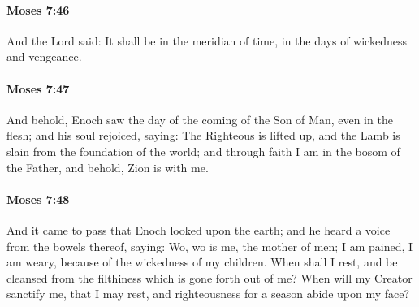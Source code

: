 		\paragraph{Moses 7:46} %
			\label{MOSES-7-46}

			And the Lord said: It shall be in the meridian of time, in the days of wickedness and vengeance.


		\paragraph{Moses 7:47} %
			\label{MOSES-7-47}

			And behold, Enoch saw the day of the coming of the Son of Man, even in the flesh; and his soul rejoiced, saying: The Righteous is lifted up, and the Lamb is slain from the foundation of the world; and through faith I am in the bosom of the Father, and behold, Zion is with me.


		\paragraph{Moses 7:48} %
			\label{MOSES-7-48}

			And it came to pass that Enoch looked upon the earth; and he heard a voice from the bowels thereof, saying: Wo, wo is me, the mother of men; I am pained, I am weary, because of the wickedness of my children. When shall I rest, and be cleansed from the filthiness which is gone forth out of me? When will my Creator sanctify me, that I may rest, and righteousness for a season abide upon my face?

